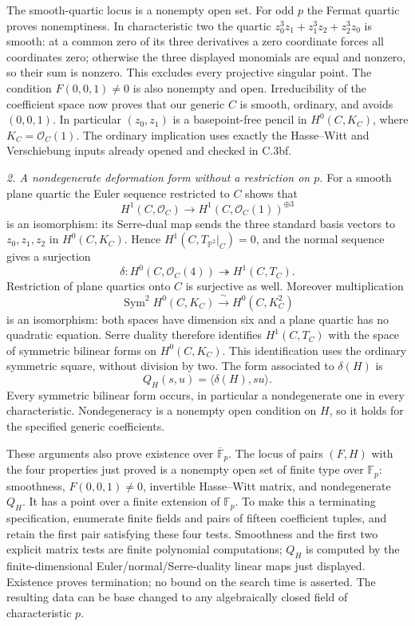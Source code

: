 The smooth-quartic locus is a nonempty open set. For odd $p$ the
Fermat quartic proves nonemptiness. In characteristic two the quartic
$z_0^3z_1+z_1^3z_2+z_2^3z_0$ is smooth: at a common zero of its
three derivatives a zero coordinate forces all coordinates zero;
otherwise the three displayed monomials are equal and nonzero, so
their sum is nonzero. This excludes every projective singular point.
The condition $F(0,0,1)\ne0$ is also nonempty and open. Irreducibility
of the coefficient space now proves that our generic $C$ is smooth,
ordinary, and avoids $(0,0,1)$. In particular $(z_0,z_1)$ is a
basepoint-free pencil in $H^0(C,K_C)$, where $K_C=\mathcal O_C(1)$.
The ordinary implication uses exactly the Hasse--Witt and
Verschiebung inputs already opened and checked in C.3bf.

\emph{2. A nondegenerate deformation form without a restriction on $p$.}
For a smooth plane quartic the Euler sequence restricted to $C$
shows that
\[
 H^1(C,\mathcal O_C)\longrightarrow
 H^1(C,\mathcal O_C(1))^{\oplus3}
\]
is an isomorphism: its Serre-dual map sends the three standard
basis vectors to $z_0,z_1,z_2$ in $H^0(C,K_C)$. Hence
$H^1(C,T_{\mathbb P^2}|_C)=0$, and the normal sequence gives a
surjection
\[
 \delta:H^0(C,\mathcal O_C(4))\twoheadrightarrow H^1(C,T_C).
\]
Restriction of plane quartics onto $C$ is surjective as well.
Moreover multiplication
\[
 \operatorname{Sym}^2 H^0(C,K_C)
       \xrightarrow{\ \sim\ }H^0(C,K_C^2)
\]
is an isomorphism: both spaces have dimension six and a plane
quartic has no quadratic equation. Serre duality therefore identifies
$H^1(C,T_C)$ with the space of symmetric bilinear forms on
$H^0(C,K_C)$. This identification uses the ordinary symmetric square,
without division by two. The form associated to $\delta(H)$ is
\[
 Q_H(s,u)=\langle\delta(H),su\rangle.
\]
Every symmetric bilinear form occurs, in particular a nondegenerate
one in every characteristic. Nondegeneracy is a nonempty open
condition on $H$, so it holds for the specified generic coefficients.

These arguments also prove existence over $\overline{\mathbb F}_p$.
The locus of pairs $(F,H)$ with the four properties just proved is a
nonempty open set of finite type over $\mathbb F_p$: smoothness,
$F(0,0,1)\ne0$, invertible Hasse--Witt matrix, and nondegenerate
$Q_H$. It has a point over a finite extension of $\mathbb F_p$.
To make this a terminating specification, enumerate finite fields
and pairs of fifteen coefficient tuples, and retain the first pair
satisfying these four tests. Smoothness and the first two explicit
matrix tests are finite polynomial computations; $Q_H$ is computed
by the finite-dimensional Euler/normal/Serre-duality linear maps
just displayed. Existence proves termination; no bound on the
search time is asserted. The resulting data can be base changed
to any algebraically closed field of characteristic $p$.

